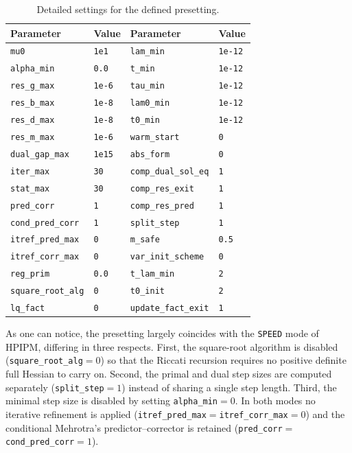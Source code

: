 \documentclass[class=scrbook, crop=false]{standalone}
\begin{document}
\begin{table}[htbp]
\caption{Detailed settings for the defined presetting.}
\label{tab:customized_settings}
\centering
\begin{tabular}{ll|ll}
\toprule
\textbf{Parameter} & \textbf{Value} & \textbf{Parameter} & \textbf{Value} \\ 
\midrule
\texttt{mu0} & \texttt{1e1} & \texttt{lam\_min} & \texttt{1e-12} \\
\texttt{alpha\_min} & \texttt{0.0} & \texttt{t\_min} & \texttt{1e-12} \\
\texttt{res\_g\_max} & \texttt{1e-6} & \texttt{tau\_min} & \texttt{1e-12} \\
\texttt{res\_b\_max} & \texttt{1e-8} & \texttt{lam0\_min} & \texttt{1e-12} \\
\texttt{res\_d\_max} & \texttt{1e-8} & \texttt{t0\_min} & \texttt{1e-12} \\
\texttt{res\_m\_max} & \texttt{1e-6} & \texttt{warm\_start} & \texttt{0} \\
\texttt{dual\_gap\_max} & \texttt{1e15} & \texttt{abs\_form} & \texttt{0} \\
\texttt{iter\_max} & \texttt{30} & \texttt{comp\_dual\_sol\_eq} & \texttt{1} \\
\texttt{stat\_max} & \texttt{30} & \texttt{comp\_res\_exit} & \texttt{1} \\
\texttt{pred\_corr} & \texttt{1} & \texttt{comp\_res\_pred} & \texttt{1} \\
\texttt{cond\_pred\_corr} & \texttt{1} & \texttt{split\_step} & \texttt{1} \\
\texttt{itref\_pred\_max} & \texttt{0} & \texttt{m\_safe} & \texttt{0.5} \\
\texttt{itref\_corr\_max} & \texttt{0} & \texttt{var\_init\_scheme} & \texttt{0} \\
\texttt{reg\_prim} & \texttt{0.0} & \texttt{t\_lam\_min} & \texttt{2} \\
\texttt{square\_root\_alg} & \texttt{0} & \texttt{t0\_init} & \texttt{2} \\
\texttt{lq\_fact} & \texttt{0} & \texttt{update\_fact\_exit} & \texttt{1} \\ 
\bottomrule
\end{tabular}
\end{table}

As one can notice, the presetting largely coincides with the \texttt{SPEED} mode of HPIPM, 
differing in three respects. 
First, the square-root algorithm is disabled (\texttt{square\_root\_alg}$=0$)
so that the Riccati recursion requires no positive definite full Hessian to carry on.
Second, the primal and dual step sizes are computed separately (\texttt{split\_step}$=1$) 
instead of sharing a single step length.
Third, the minimal step size is disabled by setting \texttt{alpha\_min}$=0$.
In both modes no iterative refinement is applied (\texttt{itref\_pred\_max}$=$\texttt{itref\_corr\_max}$=0$) 
and the conditional Mehrotra's predictor--corrector is retained (\texttt{pred\_corr}$=$\texttt{cond\_pred\_corr}$=1$).
\end{document}
